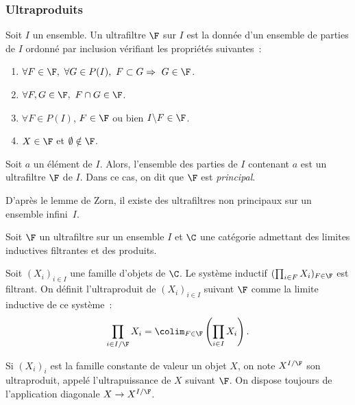 \documentclass[10pt]{../fichiers-configuration-latex/smfart}
\begin{document}
\subsubsection{Ultraproduits} \label{21-sec-ultra-filtres}

\begin{definition}
Soit $I$ un ensemble.
Un ultrafiltre $\F$ sur $I$ est la donnée d'un ensemble
 de parties de $I$ ordonné par inclusion vérifiant les propriétés
 suivantes~:
\begin{enumerate}
\item $\forall F \in \F, \ \forall G \in P(I), \ F \subset G \Rightarrow \ G \in \F$.
\item $\forall F,G \in \F, \ F \cap G \in \F$.
\item $\forall F \in P(I)$, $F \in \F$ ou bien $I\backslash F \in \F$.
\item $X \in \F$ et $\emptyset \notin \F$.
\end{enumerate}
\end{definition}

\begin{exemple}
Soit $a$ un élément de $I$. Alors, l'ensemble des parties de $I$
 contenant $a$ est un ultrafiltre $\F$ de $I$.
Dans ce cas, on dit que $\F$ est \textit{principal}.
\end{exemple}

D'après le lemme de Zorn, il existe des ultrafiltres
 non principaux sur un ensemble infini $I$.

\begin{definition}
Soit $\F$ un ultrafiltre sur un ensemble $I$
 et $\C$ une catégorie admettant des limites inductives filtrantes
  et des produits.

Soit $(X_i)_{i \in I}$ une famille d'objets de $\C$.
Le système inductif $(\prod_{i \in F} X_i)_{F \in \F}$ est filtrant.
On définit l'ultraproduit de $(X_i)_{i \in I}$
 suivant $\F$ comme la limite inductive de ce système~:
$$
\prod_{i\in I/\F} X_i
 =\colim_{F \in \F} \left( \prod_{i \in I} X_i \right).
$$

Si $(X_i)_i$ est la famille constante de valeur un objet $X$,
 on note $X^{I/\F}$ son ultraproduit, appelé l'ultrapuissance
  de $X$ suivant $\F$.
On dispose toujours de l'application diagonale
 $X \rightarrow X^{I/\F}$.
\end{definition}
\end{document}

